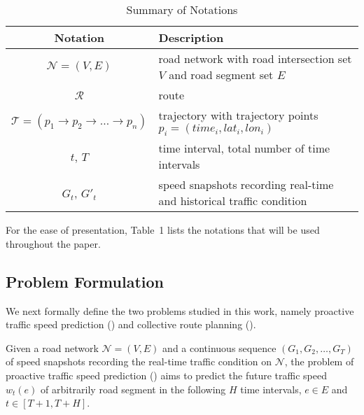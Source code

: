 \begin{table}[tb!]
\label{tab-data-stat}
\caption{Summary of Notations}
\vspace{-2.5ex}
\begin{center}
\begin{tabular}{|c|l|} \hline
\bf{Notation}   & \bf{Description}   \\ \hline\hline
$\mathcal{N}=(V,E)$ & road network with road intersection set $V$ and road segment set $E$ \\
$\mathcal{R}$ & route \\
$\mathcal{T} = (p_1 \rightarrow p_2 \rightarrow \dots \rightarrow p_n)$ & trajectory with trajectory points $p_i=(time_i,lat_i,lon_i)$\\
$t$, $T$ & time interval, total number of time intervals \\
$G_t$, $G'_t$ & speed snapshots recording real-time and historical traffic condition  \\
\hline
\end{tabular}
\vspace{0ex}
\end{center}
\end{table}

For the ease of presentation, Table~1 lists the notations that will be used throughout the paper.

\subsection{Problem Formulation}
\label{subsec-problem}

We next formally define the two problems studied in this work, namely proactive traffic speed prediction (\ptsp) and collective route planning (\crp).

\begin{definition}Given a road network $\mathcal{N}=(V,E)$ and a continuous sequence $(G_1, G_2, \dots, G_T)$ of speed snapshots recording the real-time traffic condition on $\mathcal{N}$, the problem of proactive traffic speed prediction (\ptsp) aims to predict the future traffic speed $w_t(e)$ of arbitrarily road segment in the following $H$ time intervals, \ie $e\in E$ and $t\in[T+1,T+H]$.
\end{definition}

